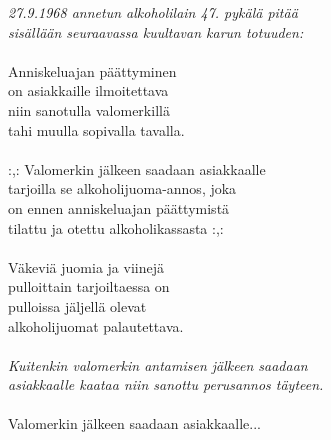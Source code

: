 
\textit{27.9.1968 annetun alkoholilain 47. pykälä pitää\\
sisällään seuraavassa kuultavan karun totuuden:}\\
\hspace{10mm}\\
Anniskeluajan päättyminen\\
on asiakkaille ilmoitettava\\
niin sanotulla valomerkillä\\
tahi muulla sopivalla tavalla.\\
\hspace{10mm}\\
:,: Valomerkin jälkeen saadaan asiakkaalle\\
tarjoilla se alkoholijuoma-annos, joka\\
on ennen anniskeluajan päättymistä\\
tilattu ja otettu alkoholikassasta :,:\\
\hspace{10mm}\\
Väkeviä juomia ja viinejä\\
pulloittain tarjoiltaessa on\\
pulloissa jäljellä olevat\\
alkoholijuomat palautettava.\\
\hspace{10mm}\\
\textit{Kuitenkin valomerkin antamisen jälkeen saadaan\\ 
asiakkaalle kaataa niin sanottu perusannos täyteen.}\\
\hspace{10mm}\\
Valomerkin jälkeen saadaan asiakkaalle...